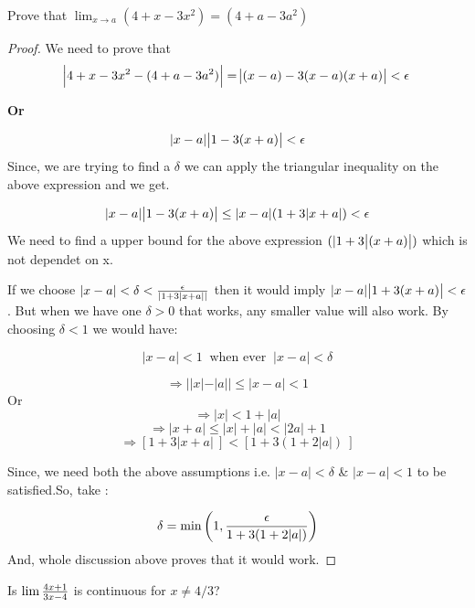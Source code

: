 \documentclass{notes}
\begin{document}
\begin{problem}
	Prove that $\lim_{x \to a} (4+x-3x^2) = (4+a-3a^2)$
\end{problem}
\begin{proof}
	We need to prove that 
	$$ \abs{4+x-3x^2 - (4+a-3a^2)} = \abs{(x-a)-3(x-a)(x+a)} < \epsilon$$
	\begin{center}
		\textbf{Or}
	\end{center}
	$$|x - a|\abs{1-3(x+a)} < \epsilon$$
	Since, we are trying to find a $\delta$ we can apply the triangular inequality on the above expression and we get.
	
	$$|x - a|\abs{1-3(x+a)} \leq| x - a|(1+3\abs{x+a}) <\epsilon$$
	We need to find a upper bound for the above expression   $(|1+3\abs{(x+a)})$   which is not dependet on x.
	
	If we choose  $ |x - a|< \delta < {\epsilon \over |1+3 | x+a ||}$ then it would imply $|x - a|\abs{1+3(x+a)} < \epsilon$. But when we have one $\delta > 0 $ that works, any smaller value will also work. By choosing $ \delta < 1$ we would have:
	
	$$ |x - a| < 1\ \text{ when ever } \ |x - a| < \delta$$
	
	$$\Rightarrow ||x| - |a|| \leq |x - a| < 1$$ 
	Or
	$$\Rightarrow |x| < 1 + |a|$$
	$$\Rightarrow |x + a| \leq  |x| + |a| < |2a| + 1$$
	$$ \Rightarrow [1 + 3 |x+a |\ ] < [1 + 3 (1+2|a  |)\ ]$$
	
	Since, we need both the above assumptions i.e. $ | x- a| < \delta$ \& $| x- a| < 1$ to be satisfied.So,       take :
	
	$$ \delta = \min \left( 1, { \epsilon \over 1 + 3(1 + 2 | a| )}   \right)   $$
	And, whole discussion above proves that it would work.
	
\end{proof}
\begin{problem}
	Is $ \lim {{4x+1} \over 3x-4} $ is continuous for $x \not = 4/3$?
\end{problem}



\end{document}
